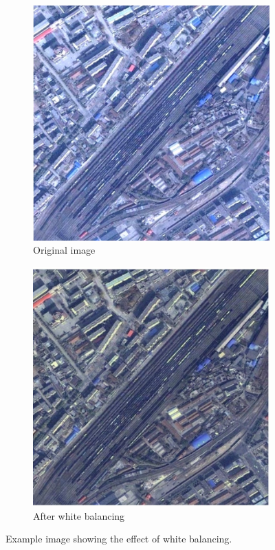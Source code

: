 \documentclass[conference]{IEEEtran}
\begin{document}
\begin{figure}
    \begin{subfigure}[b]{0.48\linewidth}
        \centerline{\includegraphics[width=\linewidth]{white_balancing_a.jpg}}
        \caption{Original image \label{subfig:wb_orig}}
    \end{subfigure}
    \begin{subfigure}[b]{0.48\linewidth}
        \centerline{\includegraphics[width=\linewidth]{white_balancing_b.jpg}}
        \caption{After white balancing \label{subfig:wb_applied}}
    \end{subfigure}
\caption{Example image showing the effect of white balancing.}
\label{fig:white_balance}
\end{figure}
\end{document}
